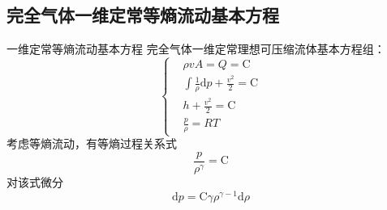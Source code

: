 \subsection{完全气体一维定常等熵流动基本方程}
\begin{frame}{一维定常等熵流动基本方程}
  完全气体一维定常理想可压缩流体基本方程组：
  \begin{equation*}
    \left\{
      \begin{aligned}
        &\rho vA = Q = \mathrm{C} 
        \\
        &
        \int{\frac{1}{\rho}}\mathrm{d}p
        +
        \frac{v^{2}}{2}
        =
        \mathrm{C}
        \\
        &
        h
        +
        \frac{v^{2}}{2}
        =
        \mathrm{C}
        \\
        &
        \frac{p}{\rho}
        =
        RT
      \end{aligned}
      \right.
  \end{equation*}
  考虑等熵流动，有等熵过程关系式
  \begin{equation*}
  \frac{p}{\rho^{\gamma}}=\mathrm{C}
  \end{equation*}
  对该式微分
  \begin{equation*}
    \mathrm{d}p
    =
    \mathrm{C}\gamma\rho^{\gamma-1}\mathrm{d}\rho
  \end{equation*}
\end{frame}

